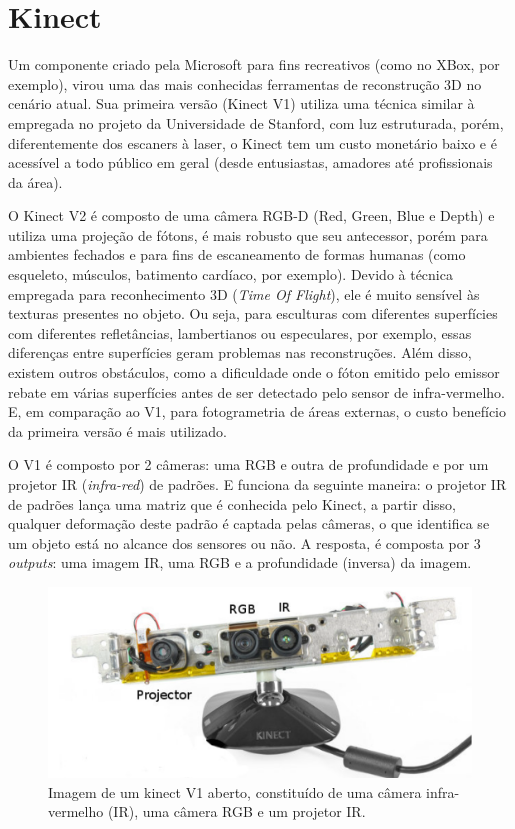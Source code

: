\chapter{Kinect}\label{sec:kinect}
Um componente criado pela Microsoft para fins recreativos (como no XBox, por exemplo), virou uma das mais conhecidas ferramentas de reconstrução 3D no cenário atual. Sua primeira versão (Kinect V1) utiliza uma técnica similar à empregada no projeto da Universidade de Stanford, com luz estruturada, porém, diferentemente dos escaners à laser, o Kinect tem um custo monetário baixo e é acessível a todo público em geral (desde entusiastas, amadores até profissionais da área). 

O Kinect V2 é composto de uma câmera RGB-D (Red, Green, Blue e Depth) e utiliza uma projeção de fótons, é mais robusto que seu antecessor, porém para ambientes fechados e para fins de escaneamento de formas humanas (como esqueleto, músculos, batimento cardíaco, por exemplo). Devido à técnica empregada para reconhecimento 3D ({\it Time Of Flight}), ele é muito sensível às texturas presentes no objeto. Ou seja, para esculturas com diferentes superfícies com diferentes refletâncias, lambertianos ou especulares, por exemplo, essas diferenças entre superfícies geram problemas nas reconstruções. Além disso, existem outros obstáculos, como a dificuldade onde o fóton emitido pelo emissor rebate em várias superfícies antes de ser detectado pelo sensor de infra-vermelho. E, em comparação ao V1, para fotogrametria de áreas externas, o custo benefício da primeira versão é mais utilizado.

O V1 é composto por 2 câmeras: uma RGB e outra de profundidade e por um projetor IR ({\it infra-red}) de padrões. E funciona da seguinte maneira: o projetor IR de padrões lança uma matriz que é conhecida pelo Kinect, a partir disso, qualquer deformação deste padrão é captada pelas câmeras, o que identifica se um objeto está no alcance dos sensores ou não. A resposta, é composta por 3 {\it outputs}: uma imagem IR,  uma RGB e a profundidade (inversa) da imagem.

\begin{figure}[!h]
	\centering
	\includegraphics[width=0.5\linewidth]{figs/kinect.png}
	\caption{%
	Imagem de um kinect V1 aberto, constituído de uma câmera infra-vermelho (IR), uma câmera RGB e um projetor IR.
	}\label{fig:kinect}
\end{figure}

